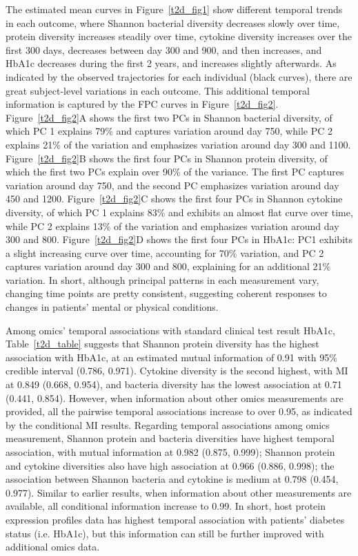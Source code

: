 \documentclass[aoas,preprint]{imsart}
\begin{document}
The estimated mean curves in Figure~\ref{t2d_fig1} show different temporal trends in each outcome, where Shannon bacterial diversity decreases slowly over time, protein diversity increases steadily over time, cytokine diversity increases over the first 300 days, decreases between day 300 and 900, and then increases, and HbA1c decreases during the first 2 years, and increases slightly afterwards. As indicated by the observed trajectories for each individual (black curves), there are great subject-level variations in each outcome. This additional temporal information is captured by the FPC curves in Figure~\ref{t2d_fig2}. Figure~\ref{t2d_fig2}A shows the first two PCs in Shannon bacterial diversity, of which PC 1 explains 79\% and captures variation around day 750, while PC 2 explains 21\% of the variation and emphasizes variation around day 300 and 1100. Figure~\ref{t2d_fig2}B shows the first four PCs in Shannon protein diversity, of which the first two PCs explain over 90\% of the variance. The first PC captures variation around day 750, and the second PC emphasizes variation around day 450 and 1200. Figure~\ref{t2d_fig2}C shows the first four PCs in Shannon cytokine diversity, of which PC 1 explains 83\% and exhibits an almost flat curve over time, while PC 2 explains 13\% of the variation and emphasizes variation around day 300 and 800. Figure~\ref{t2d_fig2}D shows the first four PCs in HbA1c: PC1 exhibits a slight increasing curve over time, accounting for 70\% variation, and PC 2 captures variation around day 300 and 800, explaining for an additional 21\% variation. In short, although principal patterns in each measurement vary, changing time points are pretty consistent, suggesting coherent responses to changes in patients’ mental or physical conditions. 

Among omics' temporal associations with standard clinical test result HbA1c, Table~\ref{t2d_table} suggests that Shannon protein diversity has the highest association with HbA1c, at an estimated mutual information of 0.91 with 95\% credible interval (0.786, 0.971). Cytokine diversity is the second highest, with MI at 0.849 (0.668, 0.954), and bacteria diversity has the lowest association at 0.71 (0.441, 0.854). However, when information about other omics measurements are provided, all the pairwise temporal associations increase to over 0.95, as indicated by the conditional MI results. Regarding temporal associations among omics measurement, Shannon protein and bacteria diversities have highest temporal association, with mutual information at 0.982 (0.875, 0.999); Shannon protein and cytokine diversities also have high association at 0.966 (0.886, 0.998); the association between Shannon bacteria and cytokine is medium at 0.798 (0.454, 0.977). Similar to earlier results, when information about other measurements are available, all conditional information increase to 0.99. In short, host protein expression profiles data has highest temporal association with patients’ diabetes status (i.e. HbA1c), but this information can still be further improved with additional omics data. 
\end{document}
